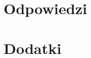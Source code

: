 \documentclass[aspectratio=1610, polish]{beamer}
\begin{document}









\part{Odpowiedzi}



\part{Dodatki}

\end{document}

